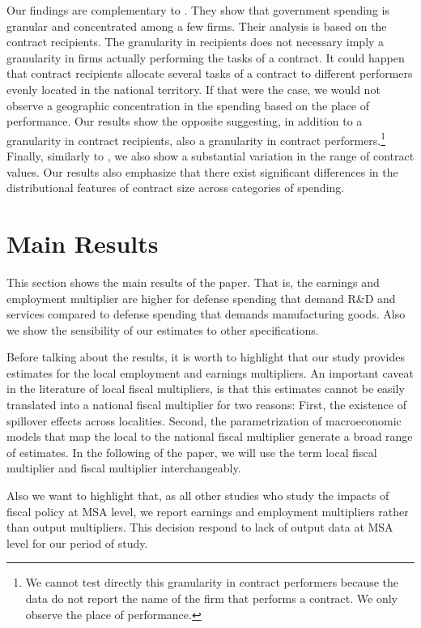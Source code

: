 \documentclass[dv_diss_main.tex]{subfiles}
\begin{document}
Our findings are complementary to \cite{Cox2021}. They show that government spending is granular and concentrated among a few firms. Their analysis is based on the contract recipients. The granularity in recipients does not necessary imply a granularity in firms actually performing the tasks of a contract. It could happen that contract recipients allocate several tasks of a contract to different performers evenly located in the national territory. If that were the case, we would not observe a geographic concentration in the spending based on the place of performance. Our results show the opposite suggesting, in addition to a granularity in contract recipients, also a granularity in contract performers.\footnote{We cannot test directly this granularity in contract performers because the data do not report the name of the firm that performs a contract. We only observe the place of performance.} Finally, similarly to \cite{Cox2021}, we also show a substantial variation in the range of contract values. Our results also emphasize that there exist significant differences in the distributional features of contract size across categories of spending.

\section{Main Results}
\label{sec:emp_fm}


This section shows the main results of the paper. That is, the earnings and employment multiplier are higher for defense spending that demand R\&D and services compared to defense spending that demands manufacturing goods. Also we show the sensibility of our estimates to other specifications.


Before talking about the results, it is worth to highlight that our study provides estimates for the local employment and earnings multipliers. An important caveat in the literature of local fiscal multipliers, is that this estimates cannot be easily translated into a national fiscal multiplier for two reasons: First, the existence of spillover effects across localities. Second, the parametrization of macroeconomic models that map the local to the national fiscal multiplier generate a broad range of estimates. In the following of the paper, we will use the term local fiscal multiplier and fiscal multiplier interchangeably. 

Also we want to highlight that, as all other studies who study the impacts of fiscal policy at MSA level, we report earnings and employment multipliers rather than output multipliers. This decision respond to lack of output data at MSA level for our period of study.
\end{document}
